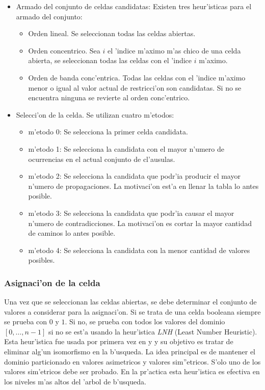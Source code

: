 \begin{itemize}

\item{Armado del conjunto de celdas candidatas}: Existen tres heur'isticas para el armado del conjunto:

\begin{itemize}
\item Orden lineal. Se seleccionan todas las celdas abiertas.
\item Orden concentrico. Sea $i$ el 'indice m'aximo m'as chico  de una celda abierta, se seleccionan todas las celdas con el 'indice $i$ m'aximo.
\item Orden de banda conc'entrica. Todas las celdas con el 'indice m'aximo menor o igual al valor actual de restricci'on son candidatas. Si no se encuentra ninguna se revierte al orden conc'entrico.
\end{itemize}


\item{Selecci'on de la celda}. Se utilizan cuatro m'etodos:

\begin{itemize}
\item{m'etodo 0}: Se selecciona la primer celda candidata.
\item{m'etodo 1}: Se selecciona la candidata con el mayor n'umero de ocurrencias en el actual conjunto de cl'ausulas.
\item{m'etodo 2}: Se selecciona la candidata que podr'ia producir el mayor n'umero de propagaciones. La motivaci'on est'a en llenar la tabla lo antes posible.
\item{m'etodo 3}: Se selecciona la candidata que podr'ia causar el mayor n'umero de contradicciones. La motivaci'on es cortar la mayor cantidad de caminos lo antes posible.
\item{m'etodo 4}: Se selecciona la candidata con la menor cantidad de valores posibles.
\end{itemize}

\end{itemize}


\subsubsection{Asignaci'on de la celda}
Una vez que se seleccionan las celdas abiertas, se debe determinar el conjunto de valores a considerar para la asignaci'on. Si se trata de una celda booleana siempre se prueba con $0$ y $1$. Si no, se prueba con todos los valores del dominio $[0,\dots,n-1]$ si no se est'a usando la heur'istica \textit{LNH} (Least Number Heuristic). Esta heur'istica fue usada por primera vez en \cite{zhang95} y \cite{zhang96} y su objetivo es tratar de eliminar alg'un isomorfismo en la b'usqueda. La idea principal es de mantener el dominio particionado en valores asimetricos y valores sim''etricos. S'olo uno de los valores sim'etricos debe ser probado. En la pr'actica esta heur'istica es efectiva en los niveles m'as altos del 'arbol de b'usqueda.


